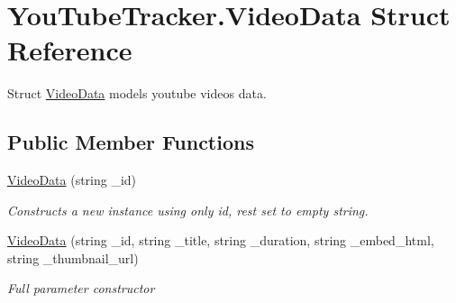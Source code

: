 \hypertarget{struct_you_tube_tracker_1_1_video_data}{}\section{You\+Tube\+Tracker.\+Video\+Data Struct Reference}
\label{struct_you_tube_tracker_1_1_video_data}


Struct {\ttfamily \mbox{\hyperlink{struct_you_tube_tracker_1_1_video_data}{Video\+Data}}} models youtube video\textquotesingle{}s data.  


\subsection*{Public Member Functions}
\begin{DoxyCompactItemize}
\item 
\mbox{\hyperlink{struct_you_tube_tracker_1_1_video_data_ae0bc57a279eeef5070b17086d2a7bcc2}{Video\+Data}} (string \+\_\+id)
\begin{DoxyCompactList}\small\item\em Constructs a new instance using only id, rest set to empty string. \end{DoxyCompactList}\item 
\mbox{\hyperlink{struct_you_tube_tracker_1_1_video_data_a5bd160817cfc9b4671d344f9a25b8277}{Video\+Data}} (string \+\_\+id, string \+\_\+title, string \+\_\+duration, string \+\_\+embed\+\_\+html, string \+\_\+thumbnail\+\_\+url)
\begin{DoxyCompactList}\small\item\em Full parameter constructor \end{DoxyCompactList}\end{DoxyCompactItemize}
